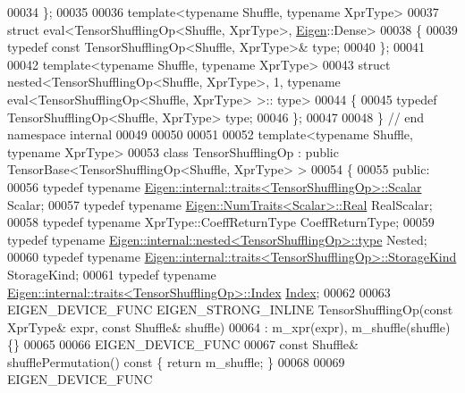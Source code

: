 \begin{DoxyCode}
00034 \};
00035 
00036 \textcolor{keyword}{template}<\textcolor{keyword}{typename} Shuffle, \textcolor{keyword}{typename} XprType>
00037 \textcolor{keyword}{struct }eval<TensorShufflingOp<Shuffle, XprType>, \hyperlink{namespace_eigen}{Eigen}::Dense>
00038 \{
00039   \textcolor{keyword}{typedef} \textcolor{keyword}{const} TensorShufflingOp<Shuffle, XprType>& type;
00040 \};
00041 
00042 \textcolor{keyword}{template}<\textcolor{keyword}{typename} Shuffle, \textcolor{keyword}{typename} XprType>
00043 \textcolor{keyword}{struct }nested<TensorShufflingOp<Shuffle, XprType>, 1, typename eval<TensorShufflingOp<Shuffle, XprType> >::
      type>
00044 \{
00045   \textcolor{keyword}{typedef} TensorShufflingOp<Shuffle, XprType> type;
00046 \};
00047 
00048 \}  \textcolor{comment}{// end namespace internal}
00049 
00050 
00051 
00052 \textcolor{keyword}{template}<\textcolor{keyword}{typename} Shuffle, \textcolor{keyword}{typename} XprType>
00053 \textcolor{keyword}{class }TensorShufflingOp : \textcolor{keyword}{public} TensorBase<TensorShufflingOp<Shuffle, XprType> >
00054 \{
00055   \textcolor{keyword}{public}:
00056   \textcolor{keyword}{typedef} \textcolor{keyword}{typename} \hyperlink{struct_eigen_1_1internal_1_1traits}{Eigen::internal::traits<TensorShufflingOp>::Scalar}
       Scalar;
00057   \textcolor{keyword}{typedef} \textcolor{keyword}{typename} \hyperlink{group___sparse_core___module}{Eigen::NumTraits<Scalar>::Real} RealScalar;
00058   \textcolor{keyword}{typedef} \textcolor{keyword}{typename} XprType::CoeffReturnType CoeffReturnType;
00059   \textcolor{keyword}{typedef} \textcolor{keyword}{typename} \hyperlink{class_eigen_1_1internal_1_1_tensor_lazy_evaluator_writable}{Eigen::internal::nested<TensorShufflingOp>::type}
       Nested;
00060   \textcolor{keyword}{typedef} \textcolor{keyword}{typename} \hyperlink{struct_eigen_1_1internal_1_1traits}{Eigen::internal::traits<TensorShufflingOp>::StorageKind}
       StorageKind;
00061   \textcolor{keyword}{typedef} \textcolor{keyword}{typename} \hyperlink{struct_eigen_1_1internal_1_1traits}{Eigen::internal::traits<TensorShufflingOp>::Index}
       \hyperlink{namespace_eigen_a62e77e0933482dafde8fe197d9a2cfde}{Index};
00062 
00063   EIGEN\_DEVICE\_FUNC EIGEN\_STRONG\_INLINE TensorShufflingOp(\textcolor{keyword}{const} XprType& expr, \textcolor{keyword}{const} Shuffle& shuffle)
00064       : m\_xpr(expr), m\_shuffle(shuffle) \{\}
00065 
00066     EIGEN\_DEVICE\_FUNC
00067     \textcolor{keyword}{const} Shuffle& shufflePermutation()\textcolor{keyword}{ const }\{ \textcolor{keywordflow}{return} m\_shuffle; \}
00068 
00069     EIGEN\_DEVICE\_FUNC

\end{DoxyCode}
